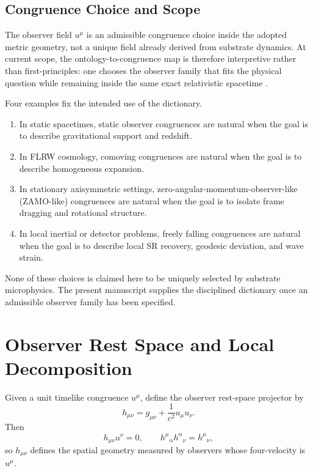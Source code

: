\documentclass[11pt]{article}
\begin{document}
\subsection{Congruence Choice and Scope}

The observer field \(u^\mu\) is an admissible congruence choice inside the adopted metric geometry, not a unique field already derived from substrate dynamics. At current scope, the ontology-to-congruence map is therefore interpretive rather than first-principles: one chooses the observer family that fits the physical question while remaining inside the same exact relativistic spacetime \cite{Raychaudhuri1955,EllisVanElst1999}.

Four examples fix the intended use of the dictionary.
\begin{enumerate}
    \item In static spacetimes, static observer congruences are natural when the goal is to describe gravitational support and redshift.
    \item In FLRW cosmology, comoving congruences are natural when the goal is to describe homogeneous expansion.
    \item In stationary axisymmetric settings, zero-angular-momentum-observer-like (ZAMO-like) congruences are natural when the goal is to isolate frame dragging and rotational structure.
    \item In local inertial or detector problems, freely falling congruences are natural when the goal is to describe local SR recovery, geodesic deviation, and wave strain.
\end{enumerate}

None of these choices is claimed here to be uniquely selected by substrate microphysics. The present manuscript supplies the disciplined dictionary once an admissible observer family has been specified.

\section{Observer Rest Space and Local Decomposition}

Given a unit timelike congruence \(u^\mu\), define the observer rest-space projector by
\begin{equation}
h_{\mu\nu}
=
g_{\mu\nu}+\frac{1}{c^2}u_\mu u_\nu.
\label{eq:projector}
\end{equation}
Then
\begin{equation}
h_{\mu\nu}u^\nu = 0,
\qquad
h^\mu{}_{\alpha}h^\alpha{}_{\nu}=h^\mu{}_{\nu},
\label{eq:projectorprops}
\end{equation}
so \(h_{\mu\nu}\) defines the spatial geometry measured by observers whose four-velocity is \(u^\mu\).
\end{document}
